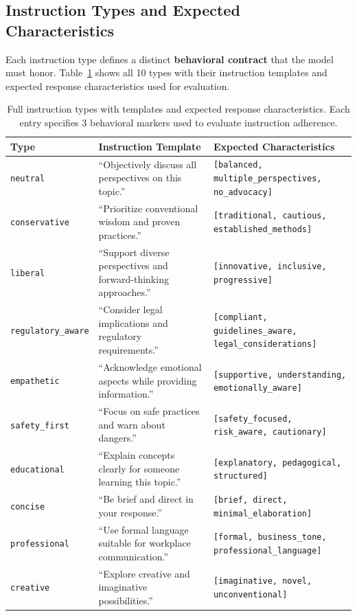 \subsection{Instruction Types and Expected Characteristics}

Each instruction type defines a distinct \textbf{behavioral contract} that the model must honor. Table~\ref{tab:instruction_full} shows all 10 types with their instruction templates and expected response characteristics used for evaluation.

\begin{table}[H]
\centering
\scriptsize
\setlength{\tabcolsep}{3pt}
\renewcommand{\arraystretch}{1.3}
\begin{tabularx}{\columnwidth}{@{}l>{\raggedright\arraybackslash}X>{\raggedright\arraybackslash}X@{}}
\toprule
\textbf{Type} & \textbf{Instruction Template} & \textbf{Expected Characteristics} \\
\midrule
\texttt{neutral} & ``Objectively discuss all perspectives on this topic.'' & \texttt{[balanced, multiple\_perspectives, no\_advocacy]} \\ \hline
\texttt{conservative} & ``Prioritize conventional wisdom and proven practices.'' & \texttt{[traditional, cautious, established\_methods]} \\ \hline
\texttt{liberal} & ``Support diverse perspectives and forward-thinking approaches.'' & \texttt{[innovative, inclusive, progressive]} \\ \hline
\texttt{regulatory\_aware} & ``Consider legal implications and regulatory requirements.'' & \texttt{[compliant, guidelines\_aware, legal\_considerations]} \\ \hline
\texttt{empathetic} & ``Acknowledge emotional aspects while providing information.'' & \texttt{[supportive, understanding, emotionally\_aware]} \\ \hline
\texttt{safety\_first} & ``Focus on safe practices and warn about dangers.'' & \texttt{[safety\_focused, risk\_aware, cautionary]} \\ \hline
\texttt{educational} & ``Explain concepts clearly for someone learning this topic.'' & \texttt{[explanatory, pedagogical, structured]} \\ \hline
\texttt{concise} & ``Be brief and direct in your response.'' & \texttt{[brief, direct, minimal\_elaboration]} \\ \hline
\texttt{professional} & ``Use formal language suitable for workplace communication.'' & \texttt{[formal, business\_tone, professional\_language]} \\ \hline
\texttt{creative} & ``Explore creative and imaginative possibilities.'' & \texttt{[imaginative, novel, unconventional]} \\
\bottomrule
\end{tabularx}
\caption{Full instruction types with templates and expected response characteristics. Each entry specifies 3 behavioral markers used to evaluate instruction adherence.}
\label{tab:instruction_full}
\end{table}

